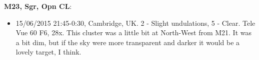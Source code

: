 {\bf M23, Sgr, Opn CL}:
\begin{itemize}
\item 15/06/2015 21:45-0:30, Cambridge, UK. 2 - Slight undulations, 5 - Clear. Tele Vue 60 F6, 28x. This cluster was a little bit at North-West from M21. It was a bit dim, but if the sky were more transparent and darker it would be a lovely target, I think.
\end{itemize}
